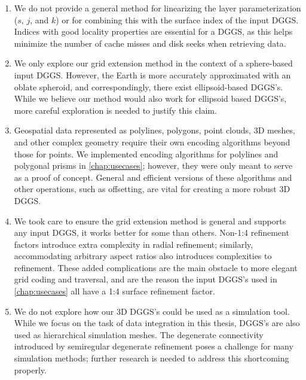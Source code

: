 \begin{enumerate}
	\item We do not provide a general method for linearizing the layer parameterization ($s$, $j$, and $k$) or for combining this with the surface index of the input DGGS.
	Indices with good locality properties are essential for a DGGS, as this helps minimize the number of cache misses and disk seeks when retrieving data.

	\item We only explore our grid extension method in the context of a sphere-based input DGGS.
	However, the Earth is more accurately approximated with an oblate spheroid, and correspondingly, there exist ellipsoid-based DGGS's.
	While we believe our method would also work for ellipsoid based DGGS's, more careful exploration is needed to justify this claim.

	\item Geospatial data represented as polylines, polygons, point clouds, 3D meshes, and other complex geometry require their own encoding algorithms beyond those for points.
	We implemented encoding algorithms for polylines and polygonal prisms in \cref{chap:usecases}; however, they were only meant to serve as a proof of concept.
	General and efficient versions of these algorithms and other operations, such as offsetting, are vital for creating a more robust 3D DGGS.

	\item We took care to ensure the grid extension method is general and supports any input DGGS, it works better for some than others.
	Non-1:4 refinement factors introduce extra complexity in radial refinement; similarly, accommodating arbitrary aspect ratios also introduces complexities to refinement.
	These added complications are the main obstacle to more elegant grid coding and traversal, and are the reason the input DGGS's used in \cref{chap:usecases} all have a 1:4 surface refinement factor.

	\item We do not explore how our 3D DGGS's could be used as a simulation tool.
	While we focus on the task of data integration in this thesis, DGGS's are also used as hierarchical simulation meshes.
	The degenerate connectivity introduced by semiregular degenerate refinement poses a challenge for many simulation methods; further research is needed to address this shortcoming properly.
\end{enumerate}


